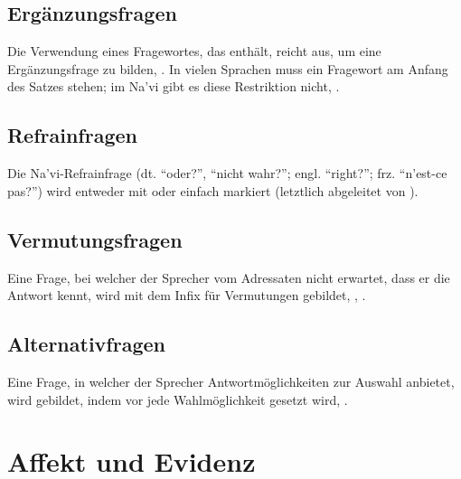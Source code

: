 \subsection{Ergänzungsfragen} Die Verwendung eines Fragewortes, das  enthält, reicht aus, um eine Ergänzungsfrage zu bilden,  . In vielen Sprachen muss ein Fragewort am Anfang des Satzes stehen; im Na'vi gibt es diese Restriktion nicht,  .

\subsection{Refrainfragen} Die Na'vi-Refrainfrage (dt. ``oder?'', ``nicht wahr?''; engl. ``right?''; frz. ``n'est-ce pas?'') wird entweder mit  oder einfach  markiert (letztlich abgeleitet von  ).

\subsection{Vermutungsfragen} Eine Frage, bei welcher der Sprecher vom Adressaten nicht erwartet, dass er die Antwort kennt, wird mit dem Infix für Vermutungen  gebildet,  ,  .

\subsection{Alternativfragen} Eine Frage, in welcher der Sprecher Antwortmöglichkeiten zur Auswahl anbietet, wird gebildet, indem  vor jede Wahlmöglichkeit gesetzt wird,  .

\section{Affekt und Evidenz}


